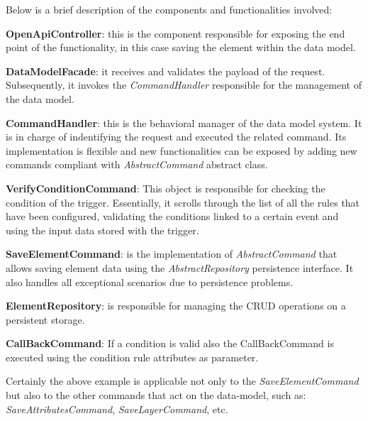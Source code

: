 Below is a brief description of the components and functionalities involved:
\begin{description}
\item \textbf{OpenApiController}: this is the component responsible for exposing the end point of the functionality, in this case saving the element within the data model.
\item \textbf{DataModelFacade}: it receives and validates the payload of the request. Subsequently, it invokes the \textit{CommandHandler} responsible for the management of the data model.
\item \textbf{CommandHandler}: this is the behavioral manager of the data model system. It is in charge of indentifying the request and executed the related command. Its implementation is flexible and new functionalities can be exposed by adding new commands compliant with \textit{AbstractCommand} abstract class.
\item \textbf{VerifyConditionCommand}: This object is responsible for checking the condition of the trigger. Essentially, it scrolls through the list of all the rules that have been configured, validating the conditions linked to a certain event and using the input data stored with the trigger.

\item \textbf{SaveElementCommand}: is the implementation of \textit{AbstractCommand} that allows saving element data using the \textit{AbstractRepository} persistence interface. It also handles all exceptional scenarios due to persistence problems.
\item \textbf{ElementRepository}: is responsible for managing the CRUD operations on a persistent storage.
\item \textbf{CallBackCommand}:  If a condition is valid also the CallBackCommand is executed using the condition rule attributes as parameter.
\end{description}
	




Certainly the above example is applicable not only to the \textit{SaveElementCommand} but also to the other commands that act on the data-model, such as: \textit{SaveAttributesCommand}, \textit{SaveLayerCommand}, etc.

